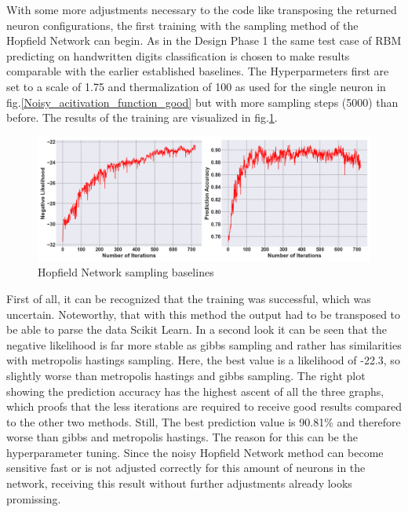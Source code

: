 With some more adjustments necessary to the code like transposing the returned neuron configurations, the first training with the sampling method of the Hopfield Network can begin. 
As in the Design Phase 1 the same test case of \ac{RBM} predicting on handwritten digits classification is chosen to make results comparable with the earlier established baselines.
The Hyperparmeters first are set to a scale of 1.75 and thermalization of 100 as used for the single neuron in fig.\ref{Noisy_acitivation_function_good} but with more sampling steps (5000) than before. 
The results of the training are visualized in fig.\ref{HNN_training}.
\begin{figure}[H]
    \centering
    \includegraphics[width=1\linewidth]{graphics/HNN_combined_plot.png}
    \caption{Hopfield Network sampling baselines}
    \label{HNN_training}
\end{figure}
First of all, it can be recognized that the training was successful, which was uncertain. 
Noteworthy, that with this method the output had to be transposed to be able to parse the data Scikit Learn.
In a second look it can be seen that the negative likelihood is far more stable as gibbs sampling and rather has similarities with metropolis hastings sampling.
Here, the best value is a likelihood of -22.3, so slightly worse than metropolis hastings and gibbs sampling. 
The right plot showing the prediction accuracy has the highest ascent of all the three graphs, which proofs that the 
less iterations are required to receive good results compared to the other two methods.
Still, The best prediction value is 90.81\% and therefore worse than gibbs and metropolis hastings. 
The reason for this can be the hyperparameter tuning.
Since the noisy Hopfield Network method can become sensitive fast or is not adjusted correctly 
for this amount of neurons in the network, receiving this result without further adjustments already looks promissing. 


